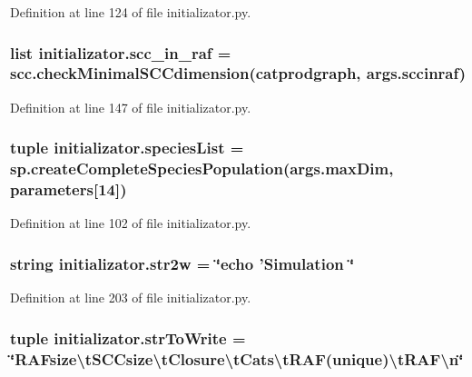Definition at line 124 of file initializator.\-py.

\hypertarget{a00135_a528fd8494c795cfcb3810626c84ae291}{
\subsubsection[{scc\-\_\-in\-\_\-raf}]{\setlength{\rightskip}{0pt plus 5cm}list initializator.\-scc\-\_\-in\-\_\-raf = scc.\-check\-Minimal\-S\-C\-Cdimension({\bf catprodgraph}, args.\-sccinraf)}}\label{a00135_a528fd8494c795cfcb3810626c84ae291}


Definition at line 147 of file initializator.\-py.

\hypertarget{a00135_a79af2b1d3fe38f2cd259cc56b1ecc5f3}{
\subsubsection[{species\-List}]{\setlength{\rightskip}{0pt plus 5cm}tuple initializator.\-species\-List = sp.\-create\-Complete\-Species\-Population(args.\-max\-Dim, {\bf parameters}\mbox{[}14\mbox{]})}}\label{a00135_a79af2b1d3fe38f2cd259cc56b1ecc5f3}


Definition at line 102 of file initializator.\-py.

\hypertarget{a00135_ae18cfdf290fd3edf979ab55e9dbb65c7}{
\subsubsection[{str2w}]{\setlength{\rightskip}{0pt plus 5cm}string initializator.\-str2w = \char`\"{}echo 'Simulation \char`\"{}}}\label{a00135_ae18cfdf290fd3edf979ab55e9dbb65c7}


Definition at line 203 of file initializator.\-py.

\hypertarget{a00135_a2425798997b1c46c8bbed77ecffcaa9f}{
\subsubsection[{str\-To\-Write}]{\setlength{\rightskip}{0pt plus 5cm}tuple initializator.\-str\-To\-Write = \char`\"{}R\-A\-Fsize\textbackslash{}t\-S\-C\-Csize\textbackslash{}t\-Closure\textbackslash{}t\-Cats\textbackslash{}t\-R\-A\-F(unique)\textbackslash{}t\-R\-A\-F\textbackslash{}n\char`\"{}}}\label{a00135_a2425798997b1c46c8bbed77ecffcaa9f}


